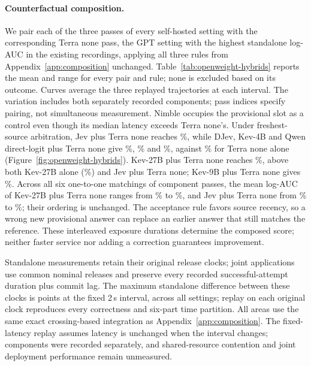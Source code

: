 \paragraph{Counterfactual composition.}
We pair each of the three passes of every self-hosted setting with the corresponding Terra none pass, the GPT setting with the highest standalone log-AUC in the existing recordings, applying all three rules from Appendix~\ref{app:composition} unchanged.
Table~\ref{tab:openweight-hybrids} reports the mean and range for every pair and rule; none is excluded based on its outcome. Curves average the three replayed trajectories at each interval. The variation includes both separately recorded components; pass indices specify pairing, not simultaneous measurement.
Nimble occupies the provisional slot as a control even though its median latency exceeds Terra none's.
Under freshest-source arbitration, Jev plus Terra none reaches \OwJevTerraNoneAuc\%, while DJev, Kev-4B and Qwen direct-logit plus Terra none give \OwDJevFreshestAuc\%, \OwKevFreshestAuc\% and \OwQwenLogitsFreshestAuc\%, against \OwTerraNoneAuc\% for Terra none alone (Figure~\ref{fig:openweight-hybrids}).
Kev-27B plus Terra none reaches \OwKevTwentySevenFreshestAuc\%, above both Kev-27B alone (\OwKevTwentySevenAuc\%) and Jev plus Terra none; Kev-9B plus Terra none gives \OwKevNineFreshestAuc\%.
Across all six one-to-one matchings of component passes, the mean log-AUC of Kev-27B plus Terra none ranges from \PairingKevTwentySevenMin\% to \PairingKevTwentySevenMax\%, and Jev plus Terra none from \PairingJevTerraNoneMin\% to \PairingJevTerraNoneMax\%; their ordering is unchanged.
The acceptance rule favors source recency, so a wrong new provisional answer can replace an earlier answer that still matches the reference.
These interleaved exposure durations determine the composed score; neither faster service nor adding a correction guarantees improvement.

Standalone measurements retain their original release clocks; joint applications use common nominal releases and preserve every recorded successful-attempt duration plus commit lag.
The maximum standalone difference between these clocks is \OwNominalGap{} points at the fixed 2\,s interval, across all \OwTotalSettingsWord{} settings; replay on each original clock reproduces every correctness and six-part time partition.
All areas use the same exact crossing-based integration as Appendix~\ref{app:composition}.
The fixed-latency replay assumes latency is unchanged when the interval changes; components were recorded separately, and shared-resource contention and joint deployment performance remain unmeasured.

